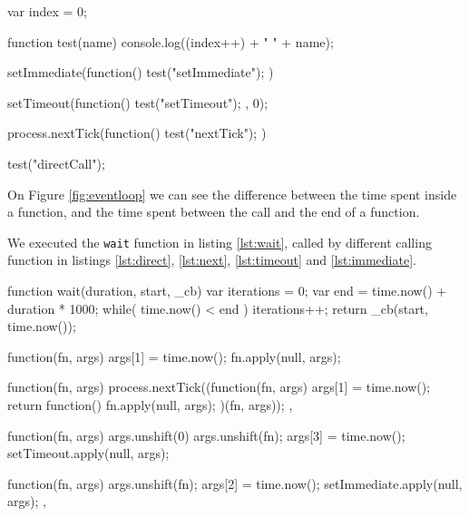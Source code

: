 \documentclass{article}
\begin{document}
\begin{code}[Javascript, caption={test order of execution},label={lst:order}]
var index = 0;

function test(name) {
  console.log((index++) + " " + name);
}

setImmediate(function() {
  test("setImmediate");
})

setTimeout(function() {
  test("setTimeout");
}, 0);

process.nextTick(function() {
  test("nextTick");
})

test("directCall");
\end{code}



On Figure \ref{fig:eventloop} we can see the difference between the time spent inside a function, and the time spent between the call and the end of a function.

We executed the \texttt{wait} function in listing \ref{lst:wait}, called by different calling function in listings \ref{lst:direct}, \ref{lst:next}, \ref{lst:timeout} and \ref{lst:immediate}.

\begin{code}[Javascript, caption={wait function},label={lst:wait}]
function wait(duration, start, _cb) {
  var iterations = 0;
  var end = time.now() + duration * 1000;
  while( time.now() < end ) {
    iterations++;
  }
  return _cb(start, time.now());
}
\end{code}


\begin{code}[Javascript, caption={Direct call},label={lst:direct}]
function(fn, args) {
  args[1] = time.now();
  fn.apply(null, args);
}
\end{code}

\begin{code}[Javascript, caption={\textit{nextTick}},label={lst:next}]
function(fn, args) {
  process.nextTick((function(fn, args) {
    args[1] = time.now();
    return function() {
      fn.apply(null, args);
    }
  })(fn, args));
},
\end{code}

\begin{code}[Javascript, caption={\textit{setTimeout}},label={lst:timeout}]
function(fn, args) {
  args.unshift(0)
  args.unshift(fn);
  args[3] = time.now();
  setTimeout.apply(null, args);
}
\end{code}

\begin{code}[Javascript, caption={\textit{setImmediate}},label={lst:immediate}]  
function(fn, args) {
  args.unshift(fn);
  args[2] = time.now();
  setImmediate.apply(null, args);
},
\end{code}



\end{document}

